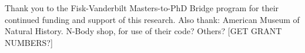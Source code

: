 \documentclass[manuscript]{aastex}
\begin{document}


\acknowledgments
Thank you to the Fisk-Vanderbilt Masters-to-PhD Bridge program for their continued funding and support of this research.
Also thank: American Museum of Natural History. N-Body shop, for use of their code? Others? [GET GRANT NUMBERS?]

\end{document}
